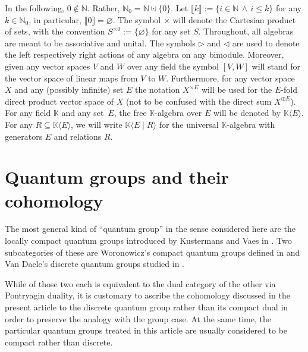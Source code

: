 \documentclass[10pt,a4paper]{amsart}
\numberwithin{equation}{section}
\newcommand{\freealg}[2]{#1\langle #2\rangle}
\newcommand{\univalg}[3]{#1\langle #2 \classpredicate #3\rangle}
\newcommand{\Sand}{\,\wedge\,}
\newcommand{\classpredicate}{\mid}
\newcommand{\SinternalhomX}[2]{[#1,#2]}
\newcommand{\nnint}{{\mathbb{N}_0}}
\newcommand{\pint}{\mathbb{N}}
\newcommand{\dwi}[1]{\llbracket{#1}\rrbracket}
\newcommand{\Sdirectsum}{\oplus}
\newcommand{\Sdirectproduct}{\times}
\newcommand{\Ssetmonoidalproduct}{\times}
\newcommand{\Sleftmoduleaction}{\triangleright}
\newcommand{\Srightmoduleaction}{\triangleleft}
\begin{document}
{
  \newcommand{\domspace}{V}
  \newcommand{\codspace}{W}
  \newcommand{\someset}{E}
  \newcommand{\somespace}{X}
  \newcommand{\somefield}{\mathbb{K}}
  \newcommand{\somerels}{R}
  \newcommand{\somemap}{f}
  \newcommand{\anyset}{S}
In the following, $0\notin \pint$. Rather, $\nnint=\pint\cupdot\{0\}$. Let $\dwi{k}:= \{i\in \pint\Sand i\leq k  \}$ for any $k\in\nnint$, in particular, $\dwi{0}=\varnothing$. The symbol $\Sdirectproduct$ will denote the Cartesian product of sets, with the convention $\anyset^{\Ssetmonoidalproduct 0}:= \{\varnothing\}$ for any set $\anyset$. Throughout, all algebras are meant to be associative and unital. The symbols $\Sleftmoduleaction$ and $\Srightmoduleaction$ are used to denote the left  respectively right actions of any algebra on any bimodule. Moreover, given any vector spaces $\domspace$ and $\codspace$ over any field the symbol $\SinternalhomX{\domspace}{\codspace}$ will stand for the vector space of linear maps from $\domspace$ to $\codspace$. Furthermore, for any vector space~$\somespace$ and any (possibly infinite) set  $\someset$ the notation $\somespace^{\Sdirectproduct\someset}$ will be used for the $\someset$-fold direct product  vector space of $\somespace$ (not to be confused with the direct sum $\somespace^{\Sdirectsum\someset}$). For any field $\somefield$ and any set~$\someset$, the free $\somefield$-algebra over $\someset$ will be denoted by $\freealg{\somefield}{ \someset}$. For any $\somerels\subseteq \freealg{\somefield}{ \someset}$, we will write $\univalg{\somefield}{\someset}{\somerels}$ for the universal $\somefield$-algebra with generators $\someset$ and relations $\somerels$.
}


\section{Quantum groups and their cohomology}
\label{section:quantum-groups}
The most general kind of ``quantum group'' in the sense considered here are the locally compact quantum groups introduced by Kustermans and Vaes in \cite{Kustermans2001, Kustermans2005, KustermansVaes2000, KustermansVaes2003}. Two subcategories of these are Woronowicz's compact quantum groups defined in \cite{Woronowicz1987b, Woronowicz1991, Woronowicz1998} and Van Daele's discrete quantum groups studied in \cite{VanDaele1996b, VanDaele1998}.

While of those two each is equivalent to the dual category of the other via Pontryagin duality, it is customary to ascribe the cohomology discussed in the present article to the discrete quantum group rather than its compact dual in order to preserve the analogy with the group case. At the same time, the particular quantum groups treated in this article are usually considered to be compact rather than discrete.
\end{document}
